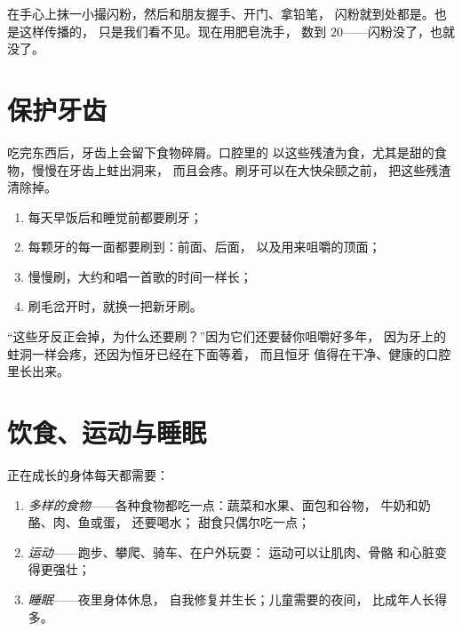 \begin{example}[闪粉实验]\label{ex:g1:healthy-habits:glitter}
在手心上抹一小撮闪粉，然后和朋友握手、开门、拿铅笔，
闪粉就到处都是。也是这样传播的，
只是我们看不见。现在用肥皂洗手，
数到 $20$——闪粉没了，也就没了。
\end{example}

\section{保护牙齿}

\begin{proposition}[为什么要刷牙]\label{prop:g1:healthy-habits:teeth}
吃完东西后，牙齿上会留下食物碎屑。口腔里的
以这些残渣为食，尤其是甜的食物，慢慢在牙齿上蛀出洞来，
而且会疼。刷牙可以在大快朵颐之前，
把这些残渣清除掉。
\end{proposition}
\admitted

\begin{method}[刷牙]\label{met:g1:healthy-habits:brush}
\begin{enumerate}
  \item 每天早饭后和睡觉前都要刷牙；
  \item 每颗牙的每一面都要刷到：前面、后面，
        以及用来咀嚼的顶面；
  \item 慢慢刷，大约和唱一首歌的时间一样长；
  \item 刷毛岔开时，就换一把新牙刷。
\end{enumerate}
\end{method}

\begin{remark}[乳牙也很重要]\label{rem:g1:healthy-habits:babyteeth}
“这些牙反正会掉，为什么还要刷？”因为它们还要替你咀嚼好多年，
因为牙上的蛀洞一样会疼，还因为恒牙已经在下面等着，
而且恒牙
值得在干净、健康的口腔里长出来。
\end{remark}

\section{饮食、运动与睡眠}

\begin{proposition}[每天的三项需要]\label{prop:g1:healthy-habits:needs}
正在成长的身体每天都需要：
\begin{enumerate}
  \item \emph{多样的食物}——各种食物都吃一点：蔬菜和水果、面包和谷物，
        牛奶和奶酪、肉、鱼或蛋，
        还要喝水；
        甜食只偶尔吃一点；
  \item \emph{运动}——跑步、攀爬、骑车、在户外玩耍：
        运动可以让肌肉、骨骼
        和心脏变得更强壮；
  \item \emph{睡眠}——夜里身体休息，
        自我修复并生长；儿童需要的夜间，
        比成年人长得多。
\end{enumerate}
\end{proposition}
\admitted

